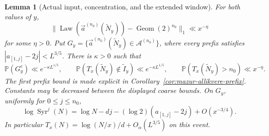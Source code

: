 \documentclass[11pt]{article}
\newtheorem{lemma}[proposition]{Lemma}
\theoremstyle{remark}\newtheorem{remark}[proposition]{Remark}
\newcommand{\PP}{\mathbb P}
\newcommand{\Syr}{\operatorname{Syr}}
\begin{document}
\begin{lemma}[Actual input, concentration, and the extended window]
\label{lem:uniform-input}
For both values of $y$,
\[
 \|\operatorname{Law}(\vec a^{(n_0)}(\widetilde N_y))
                  -\operatorname{Geom}(2)^{n_0}\|_1
 \ll x^{-\eta}
\]
for some $\eta>0$. Put
$G_y=\{\vec a^{(n_0)}(\widetilde N_y)\in\mathcal A^{(n_0)}\}$,
where every prefix satisfies $|a_{[1,j]}-2j|<L^{3/5}$. There is
$\kappa>0$ such that
\[
 \PP(G_y^c)\ll e^{-\kappa L^{1/5}},\qquad
 \PP(T_x(\widetilde N_y)\notin\widetilde I_y)
       \ll e^{-\kappa L^{1/5}},\qquad
 \PP(T_x(\widetilde N_y)>n_0)\ll x^{-\eta}.
\]
The first prefix bound is made explicit in
Corollary~\ref{cor:mazur-allikvere-prefix}. Constants may be decreased
between the displayed coarse bounds. On $G_y$, uniformly
for $0\le j\le n_0$,
\begin{equation}\label{eq:actual-drift}
 \log\Syr^j(N)=\log N-dj-(\log2)(a_{[1,j]}-2j)+O(x^{-3/4}).
\end{equation}
In particular $T_x(N)=\log(N/x)/d+O_\alpha(L^{3/5})$ on this event.
\end{lemma}
\end{document}
